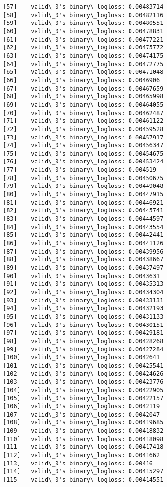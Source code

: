 \documentclass[11pt]{article}
\begin{document}
\begin{Verbatim}[commandchars=\\\{\}]
[57]	valid\_0's binary\_logloss: 0.00483714
[58]	valid\_0's binary\_logloss: 0.00482116
[59]	valid\_0's binary\_logloss: 0.00480551
[60]	valid\_0's binary\_logloss: 0.00478831
[61]	valid\_0's binary\_logloss: 0.00477221
[62]	valid\_0's binary\_logloss: 0.00475772
[63]	valid\_0's binary\_logloss: 0.00474175
[64]	valid\_0's binary\_logloss: 0.00472775
[65]	valid\_0's binary\_logloss: 0.00471048
[66]	valid\_0's binary\_logloss: 0.0046906
[67]	valid\_0's binary\_logloss: 0.00467659
[68]	valid\_0's binary\_logloss: 0.00465998
[69]	valid\_0's binary\_logloss: 0.00464055
[70]	valid\_0's binary\_logloss: 0.00462487
[71]	valid\_0's binary\_logloss: 0.00461122
[72]	valid\_0's binary\_logloss: 0.00459528
[73]	valid\_0's binary\_logloss: 0.00457917
[74]	valid\_0's binary\_logloss: 0.00456347
[75]	valid\_0's binary\_logloss: 0.00454675
[76]	valid\_0's binary\_logloss: 0.00453424
[77]	valid\_0's binary\_logloss: 0.004519
[78]	valid\_0's binary\_logloss: 0.00450675
[79]	valid\_0's binary\_logloss: 0.00449048
[80]	valid\_0's binary\_logloss: 0.00447915
[81]	valid\_0's binary\_logloss: 0.00446921
[82]	valid\_0's binary\_logloss: 0.00445741
[83]	valid\_0's binary\_logloss: 0.00444597
[84]	valid\_0's binary\_logloss: 0.00443554
[85]	valid\_0's binary\_logloss: 0.00442441
[86]	valid\_0's binary\_logloss: 0.00441126
[87]	valid\_0's binary\_logloss: 0.00439956
[88]	valid\_0's binary\_logloss: 0.00438667
[89]	valid\_0's binary\_logloss: 0.00437497
[90]	valid\_0's binary\_logloss: 0.0043631
[91]	valid\_0's binary\_logloss: 0.00435313
[92]	valid\_0's binary\_logloss: 0.00434304
[93]	valid\_0's binary\_logloss: 0.00433131
[94]	valid\_0's binary\_logloss: 0.00432193
[95]	valid\_0's binary\_logloss: 0.00431133
[96]	valid\_0's binary\_logloss: 0.00430151
[97]	valid\_0's binary\_logloss: 0.00429181
[98]	valid\_0's binary\_logloss: 0.00428268
[99]	valid\_0's binary\_logloss: 0.00427284
[100]	valid\_0's binary\_logloss: 0.0042641
[101]	valid\_0's binary\_logloss: 0.00425541
[102]	valid\_0's binary\_logloss: 0.00424626
[103]	valid\_0's binary\_logloss: 0.00423776
[104]	valid\_0's binary\_logloss: 0.00422905
[105]	valid\_0's binary\_logloss: 0.00422157
[106]	valid\_0's binary\_logloss: 0.0042119
[107]	valid\_0's binary\_logloss: 0.0042047
[108]	valid\_0's binary\_logloss: 0.00419685
[109]	valid\_0's binary\_logloss: 0.00418832
[110]	valid\_0's binary\_logloss: 0.00418098
[111]	valid\_0's binary\_logloss: 0.00417418
[112]	valid\_0's binary\_logloss: 0.0041662
[113]	valid\_0's binary\_logloss: 0.00416
[114]	valid\_0's binary\_logloss: 0.00415297
[115]	valid\_0's binary\_logloss: 0.00414551

\end{Verbatim}
\end{document}
